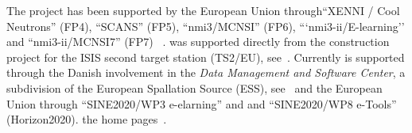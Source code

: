 The \MCS project has been supported by the European Union
through``XENNI / Cool Neutrons'' (FP4), ``SCANS'' (FP5),
``nmi3/MCNSI'' (FP6), ```nmi3-ii/E-learning'' and ``nmi3-ii/MCNSI7''
(FP7) ~\cite{nmi3_webpage,mcnsi_webpage}.
\MCS was supported directly from the construction project for the ISIS second
target station (TS2/EU), see~\cite{ts2_webpage}. Currently \MCS is 
supported through the Danish involvement in the \emph{Data Management
  and Software Center}, a subdivision of the 
European Spallation Source (ESS), see~\cite{ess_webpage} and the
European Union through ``SINE2020/WP3 e-elarning''
and and ``SINE2020/WP8 e-Tools'' (Horizon2020).
the home pages~\cite{sine2020_webpage}.

